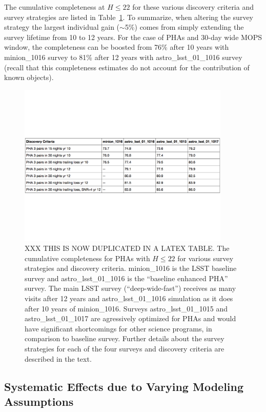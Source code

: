 The cumulative completeness at $H\le22$ for these various discovery criteria and survey strategies are listed in Table~\ref{tab:completeness}. To summarize, when altering the survey strategy the largest individual gain ($\sim$5\%) 
comes from simply extending the survey lifetime from 10 to 12 years. For the case of PHAs and 30-day wide MOPS window,
the completeness can be boosted from 76\% after 10 years with minion\_1016 survey to 81\% after 12 years with 
astro\_lsst\_01\_1016 survey (recall that this completeness estimates do not account for the contribution of known objects). 


\begin{figure}[t!]
\centering
\includegraphics[width=0.90\textwidth]{figures/PHA_cumulative_completeness}
\caption{XXX THIS IS NOW DUPLICATED IN A LATEX TABLE.
The cumulative completeness for PHAs with $H\le22$ for various survey strategies and discovery criteria.
minion\_1016 is the LSST baseline survey and astro\_lsst\_01\_1016 is the ``baseline enhanced PHA'' survey.
The main LSST survey (``deep-wide-fast'') receives as many visits after 12 years and astro\_lsst\_01\_1016 simulation
as it does after 10 years of minion\_1016. Surveys astro\_lsst\_01\_1015 and astro\_lsst\_01\_1017 are agressively 
optimized for PHAs and would have significant shortcomings for other science programs, in comparison to baseline survey. 
Further details about the survey strategies for each of the four surveys and discovery criteria are described in the text.
\label{tab:completeness}}
\end{figure}



\subsection{Systematic Effects due to Varying Modeling Assumptions \label{sec:syseff}}

